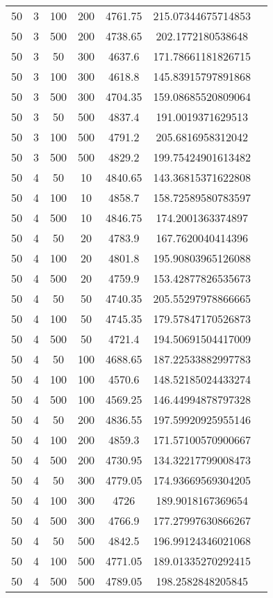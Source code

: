 {\begin{longtabu}{S
S
S
S
S
S[round-mode=places, round-precision=0]
S[round-mode=places, round-precision=0]}
50 & 3 & 100 & 200 & 4761.75 & 215.07344675714853 \\
50 & 3 & 500 & 200 & 4738.65 & 202.1772180538648 \\
50 & 3 & 50 & 300 & 4637.6 & 171.78661181826715 \\
50 & 3 & 100 & 300 & 4618.8 & 145.83915797891868 \\
50 & 3 & 500 & 300 & 4704.35 & 159.08685520809064 \\
50 & 3 & 50 & 500 & 4837.4 & 191.0019371629513 \\
50 & 3 & 100 & 500 & 4791.2 & 205.6816958312042 \\
50 & 3 & 500 & 500 & 4829.2 & 199.75424901613482 \\
50 & 4 & 50 & 10 & 4840.65 & 143.36815371622808 \\
50 & 4 & 100 & 10 & 4858.7 & 158.72589580783597 \\
50 & 4 & 500 & 10 & 4846.75 & 174.2001363374897 \\
50 & 4 & 50 & 20 & 4783.9 & 167.7620040414396 \\
50 & 4 & 100 & 20 & 4801.8 & 195.90803965126088 \\
50 & 4 & 500 & 20 & 4759.9 & 153.42877826535673 \\
50 & 4 & 50 & 50 & 4740.35 & 205.55297978866665 \\
50 & 4 & 100 & 50 & 4745.35 & 179.57847170526873 \\
50 & 4 & 500 & 50 & 4721.4 & 194.50691504417009 \\
50 & 4 & 50 & 100 & 4688.65 & 187.22533882997783 \\
50 & 4 & 100 & 100 & 4570.6 & 148.52185024433274 \\
50 & 4 & 500 & 100 & 4569.25 & 146.44994878797328 \\
50 & 4 & 50 & 200 & 4836.55 & 197.59920925955146 \\
50 & 4 & 100 & 200 & 4859.3 & 171.57100570900667 \\
50 & 4 & 500 & 200 & 4730.95 & 134.32217799008473 \\
50 & 4 & 50 & 300 & 4779.05 & 174.93669569304205 \\
50 & 4 & 100 & 300 & 4726 & 189.9018167369654 \\
50 & 4 & 500 & 300 & 4766.9 & 177.27997630866267 \\
50 & 4 & 50 & 500 & 4842.5 & 196.99124346021068 \\
50 & 4 & 100 & 500 & 4771.05 & 189.01335270292415 \\
50 & 4 & 500 & 500 & 4789.05 & 198.2582848205845 \\

\end{longtabu}}
